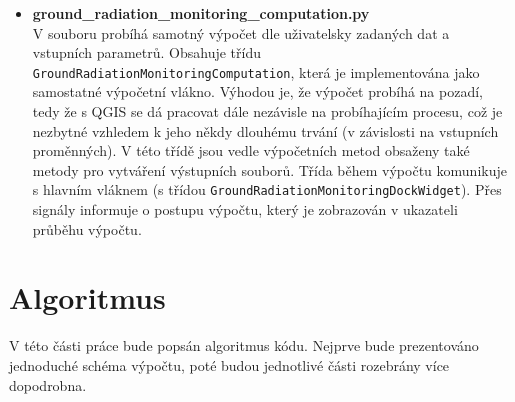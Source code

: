 \begin{itemize}
	\item \textbf{ground\_radiation\_monitoring\_computation.py} \\
		V souboru probíhá samotný výpočet dle uživatelsky zadaných dat a vstupních parametrů. Obsahuje třídu \texttt{GroundRadiationMonitoringComputation}, která je implementována jako samostatné výpočetní vlákno. Výhodou je, že výpočet probíhá na pozadí, tedy že s QGIS se dá pracovat dále nezávisle na probíhajícím procesu, což je nezbytné vzhledem k jeho někdy dlouhému trvání (v závislosti na vstupních proměnných). V této třídě jsou vedle výpočetních metod obsaženy také metody pro vytváření výstupních souborů. Třída během výpočtu komunikuje s hlavním vláknem (s třídou \texttt{GroundRadiationMonitoringDockWidget}). Přes signály informuje o postupu výpočtu, který je zobrazován v ukazateli průběhu výpočtu.
	
\end{itemize}

\newpage
\section{Algoritmus}
V této části práce bude popsán algoritmus kódu. Nejprve bude prezentováno jednoduché schéma výpočtu, poté budou jednotlivé části rozebrány více dopodrobna.

